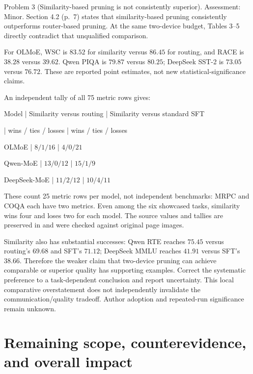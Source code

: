 \documentclass[10pt]{article}
\begin{document}
Problem 3 (Similarity-based pruning is not consistently superior).  Assessment: Minor. Section 4.2 (p. 7) states that similarity-based pruning consistently outperforms router-based pruning. At the same two-device budget, Tables 3–5 directly contradict that unqualified comparison.\par
For OLMoE, WSC is \(83.52\) for similarity versus \(86.45\) for routing, and RACE is \(38.28\) versus \(39.62\). Qwen PIQA is \(79.87\) versus \(80.25\); DeepSeek SST-2 is \(73.05\) versus \(76.72\). These are reported point estimates, not new statistical-significance claims.\par
An independent tally of all 75 metric rows gives:\par
Model | Similarity versus routing | Similarity versus standard SFT\par
| wins / ties / losses | wins / ties / losses\par
OLMoE | \(8/1/16\) | \(4/0/21\)\par
Qwen-MoE | \(13/0/12\) | \(15/1/9\)\par
DeepSeek-MoE | \(11/2/12\) | \(10/4/11\)\par
These count 25 metric rows per model, not independent benchmarks: MRPC and COQA each have two metrics. Even among the six showcased tasks, similarity wins four and loses two for each model. The source values and tallies are preserved in and were checked against original page images.\par
Similarity also has substantial successes: Qwen RTE reaches \(75.45\) versus routing’s \(69.68\) and SFT’s \(71.12\); DeepSeek MMLU reaches \(41.91\) versus SFT’s \(38.66\). Therefore the weaker claim that two-device pruning can achieve comparable or superior quality has supporting examples. Correct the systematic preference to a task-dependent conclusion and report uncertainty. This local comparative overstatement does not independently invalidate the communication/quality tradeoff. Author adoption and repeated-run significance remain unknown.\par
\section*{Remaining scope, counterevidence, and overall impact}
\end{document}
